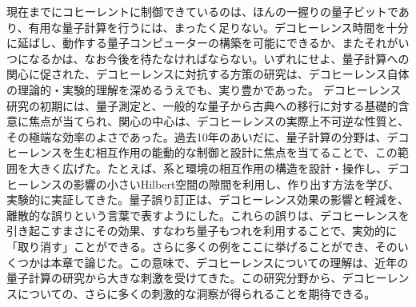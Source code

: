 現在までにコヒーレントに制御できているのは、ほんの一握りの量子ビットであり、有用な量子計算を行うには、まったく足りない。デコヒーレンス時間を十分に延ばし、動作する量子コンピューターの構築を可能にできるか、またそれがいつになるかは、なお今後を待たなければならない。いずれにせよ、量子計算への関心に促された、デコヒーレンスに対抗する方策の研究は、デコヒーレンス自体の理論的・実験的理解を深めるうえでも、実り豊かであった。
\hypertarget{srcpage:328}{}\label{srcpage:328}
デコヒーレンス研究の初期には、量子測定と、一般的な量子から古典への移行に対する基礎的含意に焦点が当てられ、関心の中心は、デコヒーレンスの実際上不可逆な性質と、その極端な効率のよさであった。過去10年のあいだに、量子計算の分野は、デコヒーレンスを生む相互作用の能動的な制御と設計に焦点を当てることで、この範囲を大きく広げた。たとえば、系と環境の相互作用の構造を設計・操作し、デコヒーレンスの影響の小さいHilbert空間の隙間を利用し、作り出す方法を学び、実験的に実証してきた。量子誤り訂正は、デコヒーレンス効果の影響と軽減を、離散的な誤りという言葉で表すようにした。これらの誤りは、デコヒーレンスを引き起こすまさにその効果、すなわち量子もつれを利用することで、実効的に「取り消す」ことができる。さらに多くの例をここに挙げることができ、そのいくつかは本章で論じた。この意味で、デコヒーレンスについての理解は、近年の量子計算の研究から大きな刺激を受けてきた。この研究分野から、デコヒーレンスについての、さらに多くの刺激的な洞察が得られることを期待できる。

